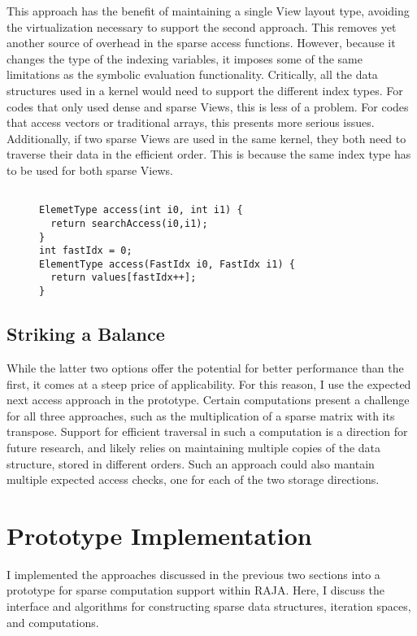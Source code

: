 This approach has the benefit of maintaining a single View layout type, avoiding the virtualization necessary to support the second approach.
This removes yet another source of overhead in the sparse access functions.
However, because it changes the type of the indexing variables, it imposes some of the same limitations as the symbolic evaluation functionality. 
Critically, all the data structures used in a kernel would need to support the different index types. 
For codes that only used dense and sparse Views, this is less of a problem.
For codes that access vectors or traditional arrays, this presents more serious issues.
Additionally, if two sparse Views are used in the same kernel, they both need to traverse their data in the efficient order.
This is because the same index type has to be used for both sparse Views.


\begin{figure}
\begin{lstlisting}[caption={Reference implementation for the Specialized Index Types approach.}, label=specializedIndexImpl]

ElemetType access(int i0, int i1) {
  return searchAccess(i0,i1);
}
int fastIdx = 0;
ElementType access(FastIdx i0, FastIdx i1) {
  return values[fastIdx++];
}
\end{lstlisting}
\end{figure}

\subsection{Striking a Balance}
While the latter two options offer the potential for better performance than the first, it comes at a steep price of applicability.
For this reason, I use the expected next access approach in the prototype.
Certain computations present a challenge for all three approaches, such as the multiplication of a sparse matrix with its transpose.
Support for efficient traversal in such a computation is a direction for future research, and likely relies on maintaining multiple copies of the data structure, stored in different orders.
Such an approach could also mantain multiple expected access checks, one for each of the two storage directions.

\section{Prototype Implementation}
I implemented the approaches discussed in the previous two sections into a prototype for sparse computation support within RAJA\@.
Here, I discuss the interface and algorithms for constructing sparse data structures, iteration spaces, and computations.

